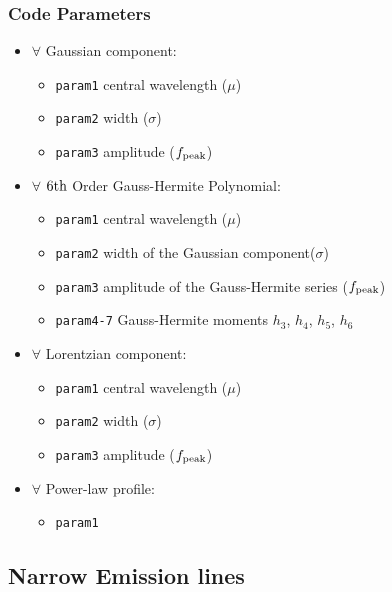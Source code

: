 \documentclass[12pt,letterpaper]{article}
\begin{document}
\subsubsection*{Code Parameters}
\begin{itemize}
    \item $\forall$ Gaussian component:
	\begin{itemize}
	    \item{\tt param1} central wavelength ($\mu$)
	    \item{\tt param2} width ($\sigma$)
	    \item{\tt param3} amplitude ($f_{\rm peak}$)	    
	\end{itemize}

    \item $\forall$ $6{\rm th}$ Order Gauss-Hermite Polynomial:
	\begin{itemize}
	    \item{\tt param1} central wavelength ($\mu$)
	    \item{\tt param2} width of the Gaussian component($\sigma$)
	    \item{\tt param3} amplitude of the Gauss-Hermite series ($f_{\rm peak}$)
	    \item{\tt param4-7} Gauss-Hermite moments $h_3$, $h_4$, $h_5$, $h_6$
	\end{itemize}   

    \item $\forall$ Lorentzian component:
	\begin{itemize}
	    \item{\tt param1} central wavelength ($\mu$)
	    \item{\tt param2} width ($\sigma$)
	    \item{\tt param3} amplitude ($f_{\rm peak}$)	    
	\end{itemize}   

    \item $\forall$ Power-law profile:
	\begin{itemize}
	    \item{\tt param1}     
	\end{itemize}   

\end{itemize}

\subsection*{Narrow Emission lines}
\end{document}
